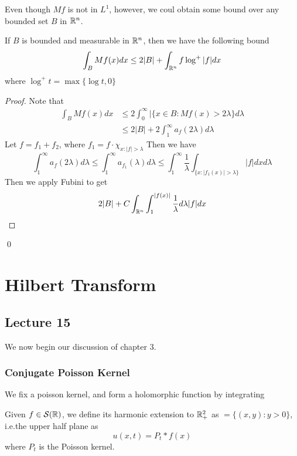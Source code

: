 Even though $Mf$ is not in $L^1$, however, we coul obtain some bound over any bounded set $B$ in $\mathbb{R}^n$.
\begin{theorem}
    If $B$ is bounded and measurable in $\mathbb{R}^n$, then we have the following bound
    \begin{equation*}
        \int_BMf(x)dx\leq 2|B|+\int_{\mathbb{R}^n}f\log^+|f|dx
    \end{equation*}
    where $\log^+t=\max{\{\log t, 0\}}$
\end{theorem}
\begin{proof}
    Note that
    \begin{align*}
        \int_BMf(x)dx&\leq 2\int_0^\infty|\{x\in B: Mf(x)>2\lambda\}d\lambda\\
        &\leq 2|B|+2\int_1^\infty a_f(2\lambda)d\lambda
    \end{align*}
    Let $f=f_1+f_2$, where $f_1=f\cdot\chi_{x:|f|>\lambda}$
    Then we have
    \begin{equation*}
        \int_1^\infty a_f(2\lambda)d\lambda\leq \int_1^\infty a_{f_1}(\lambda)d\lambda\leq\int_1^\infty\frac{1}{\lambda}\int_{\{x: |f_1(x)|>\lambda\}}|f|dxd\lambda
    \end{equation*}
    Then we apply Fubini to get 
    \begin{equation}
        2|B|+C\int_{\mathbb{R}^n}\int_1^{|f(x)|}\frac{1}{\lambda}d\lambda |f|dx
    \end{equation}
\end{proof}
\qed

\chapter{Hilbert Transform}

\section{Lecture 15}
We now begin our discussion of chapter 3.

\subsection{Conjugate Poisson Kernel}
We fix a poisson kernel, and form a holomorphic function by integrating 

\begin{definition}
    Given $f\in\mathcal{S}(\mathbb{R})$, we define its harmonic extension to $\mathbb{R}_+^2$ as $=\{(x,y): y>0\}$, i.e.the upper half plane as
    \begin{equation}
        u(x,t)=P_t\ast f(x)
    \end{equation}
    where $P_t$ is the Poisson kernel.
\end{definition}

